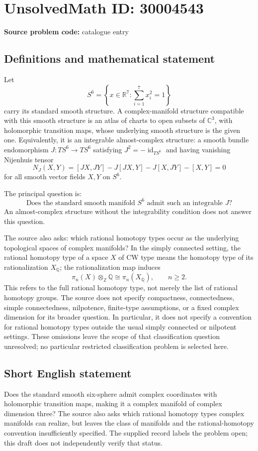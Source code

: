 \documentclass[11pt]{article}
\newcommand{\Z}{\mathbb{Z}}
\newcommand{\Q}{\mathbb{Q}}
\newcommand{\R}{\mathbb{R}}
\newcommand{\C}{\mathbb{C}}
\begin{document}
\section*{UnsolvedMath ID: 30004543}
\textbf{Source problem code:} catalogue entry
\subsection{Definitions and mathematical statement}
Let
\[
S^6=\left\{x\in\R^7:\sum_{i=1}^{7}x_i^2=1\right\}
\]
carry its standard smooth structure. A complex-manifold structure compatible with this smooth structure is an atlas of charts to open subsets of \(\C^3\), with holomorphic transition maps, whose underlying smooth structure is the given one. Equivalently, it is an integrable almost-complex structure: a smooth bundle endomorphism \(J:TS^6\to TS^6\) satisfying \(J^2=-\operatorname{id}_{TS^6}\) and having vanishing Nijenhuis tensor
\[
N_J(X,Y)=[JX,JY]-J[JX,Y]-J[X,JY]-[X,Y]=0
\]
for all smooth vector fields \(X,Y\) on \(S^6\).

The principal question is:
\[
\text{Does the standard smooth manifold }S^6\text{ admit such an integrable }J?
\]
An almost-complex structure without the integrability condition does not answer this question.

The source also asks: which rational homotopy types occur as the underlying topological spaces of complex manifolds? In the simply connected setting, the rational homotopy type of a space \(X\) of CW type means the homotopy type of its rationalization \(X_{\Q}\); the rationalization map induces
\[
\pi_n(X)\otimes_{\Z}\Q\cong\pi_n(X_{\Q}),\qquad n\geq 2.
\]
This refers to the full rational homotopy type, not merely the list of rational homotopy groups. The source does not specify compactness, connectedness, simple connectedness, nilpotence, finite-type assumptions, or a fixed complex dimension for its broader question. In particular, it does not specify a convention for rational homotopy types outside the usual simply connected or nilpotent settings. These omissions leave the scope of that classification question unresolved; no particular restricted classification problem is selected here.
\subsection{Short English statement}
Does the standard smooth six-sphere admit complex coordinates with holomorphic transition maps, making it a complex manifold of complex dimension three? The source also asks which rational homotopy types complex manifolds can realize, but leaves the class of manifolds and the rational-homotopy convention insufficiently specified. The supplied record labels the problem open; this draft does not independently verify that status.
\end{document}
